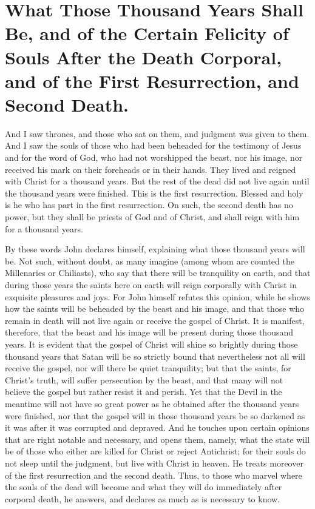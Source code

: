 \chapter[Sermon 88. What Those Thousand Years Shall Be, and of the Certain Felicity of Souls After the Death Corporal, and of the First Resurrection, and Second Death.]{What Those Thousand Years Shall Be, and of the Certain Felicity of Souls After the Death Corporal, and of the First Resurrection, and Second Death.}
\label{sermon:088}

And I saw thrones, and those who sat on them, and judgment was given to them. And I saw the souls of those who had been beheaded for the testimony of Jesus and for the word of God, who had not worshipped the beast, nor his image, nor received his mark on their foreheads or in their hands. They lived and reigned with Christ for a thousand years. But the rest of the dead did not live again until the thousand years were finished. This is the first resurrection. Blessed and holy is he who has part in the first resurrection. On such, the second death has no power, but they shall be priests of God and of Christ, and shall reign with him for a thousand years.

By these words John declares himself, explaining what those thousand years will be. Not such, without doubt, as many imagine (among whom are counted the Millenaries or Chiliasts), who say that there will be tranquility on earth, and that during those years the saints here on earth will reign corporally with Christ in exquisite pleasures and joys. For John himself refutes this opinion, while he shows how the saints will be beheaded by the beast and his image, and that those who remain in death will not live again or receive the gospel of Christ. It is manifest, therefore, that the beast and his image will be present during those thousand years. It is evident that the gospel of Christ will shine so brightly during those thousand years that Satan will be so strictly bound that nevertheless not all will receive the gospel, nor will there be quiet tranquility; but that the saints, for Christ’s truth, will suffer persecution by the beast, and that many will not believe the gospel but rather resist it and perish. Yet that the Devil in the meantime will not have so great power as he obtained after the thousand years were finished, nor that the gospel will in those thousand years be so darkened as it was after it was corrupted and depraved. And he touches upon certain opinions that are right notable and necessary, and opens them, namely, what the state will be of those who either are killed for Christ or reject Antichrist; for their souls do not sleep until the judgment, but live with Christ in heaven. He treats moreover of the first resurrection and the second death. Thus, to those who marvel where the souls of the dead will become and what they will do immediately after corporal death, he answers, and declares as much as is necessary to know.

